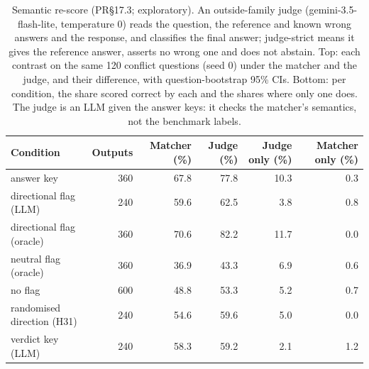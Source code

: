 \begin{table}[t]
\vspace{4pt}
\begin{tabular}{lrrrrr}
\toprule
Condition & Outputs & Matcher (\%) & Judge (\%) & Judge only (\%) & Matcher only (\%) \\
\midrule
answer key & 360 & 67.8 & 77.8 & 10.3 & 0.3 \\
directional flag (LLM) & 240 & 59.6 & 62.5 & 3.8 & 0.8 \\
directional flag (oracle) & 360 & 70.6 & 82.2 & 11.7 & 0.0 \\
neutral flag (oracle) & 360 & 36.9 & 43.3 & 6.9 & 0.6 \\
no flag & 600 & 48.8 & 53.3 & 5.2 & 0.7 \\
randomised direction (H31) & 240 & 54.6 & 59.6 & 5.0 & 0.0 \\
verdict key (LLM) & 240 & 58.3 & 59.2 & 2.1 & 1.2 \\
\bottomrule
\end{tabular}
\caption{Semantic re-score (PR\S17.3; exploratory). An outside-family judge (gemini-3.5-flash-lite, temperature 0) reads
the question, the reference and known wrong answers and the response, and classifies the final answer; judge-strict
means it gives the reference answer, asserts no wrong one and does not abstain. Top: each contrast on the same
120 conflict questions (seed 0) under the matcher and the judge, and their difference, with question-bootstrap
95\% CIs. Bottom: per condition, the share scored correct by each and the shares where only one does. The judge is
an LLM given the answer keys: it checks the matcher's semantics, not the benchmark labels.}
\label{tab:semantic}
\end{table}
